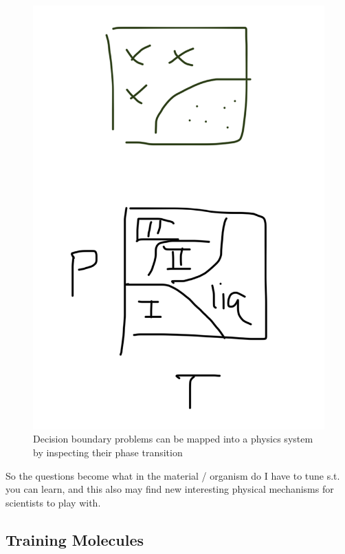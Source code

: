 \begin{figure}[h!]
	\centering
	\includegraphics[scale=0.5]{figures/murugan/DecisionBoundary_PhaseDiagram.png}
	\caption{Decision boundary problems can be mapped into a physics system by inspecting their phase transition}
\end{figure}
So the questions become what in the material / organism do I have to tune s.t. you can learn, and this also may find new interesting physical mechanisms for scientists to play with.

\subsection{Training Molecules}
